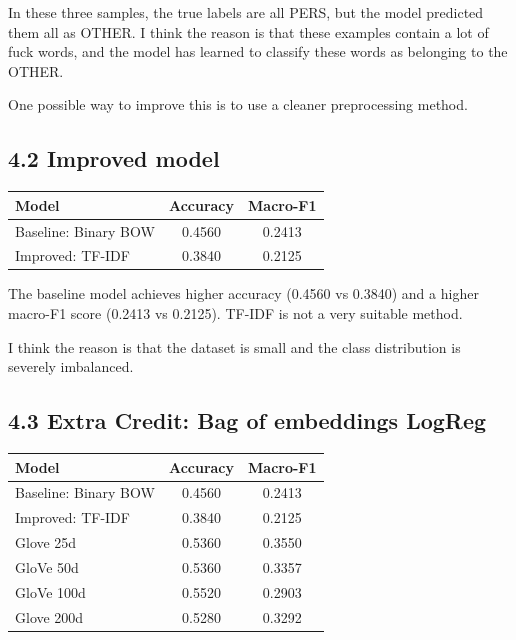 \documentclass[11pt]{article}
\begin{document}
\noindent In these three samples, the true labels are all PERS, but the model predicted them all as OTHER. I think the reason is that these examples contain a lot of fuck words, and the model has learned to classify these words as belonging to the OTHER.

\noindent One possible way to improve this is to use a cleaner preprocessing method.


\subsection*{4.2 Improved model}

\begin{table}[h]
\centering
\begin{tabular}{lcc}
\hline
\textbf{Model} & \textbf{Accuracy} & \textbf{Macro-F1} \\
\hline
Baseline: Binary BOW & 0.4560 & 0.2413 \\
Improved: TF-IDF & 0.3840 & 0.2125 \\
\hline
\end{tabular}
\end{table}

\noindent The baseline model achieves higher accuracy (0.4560 vs 0.3840) and a higher macro-F1 score (0.2413 vs 0.2125). TF-IDF is not a very suitable method.

\noindent I think the reason is that the dataset is small and the class distribution is severely imbalanced.


\newpage
\subsection*{4.3 Extra Credit: Bag of embeddings LogReg}
\begin{table}[h]
\centering
\begin{tabular}{lcc}
\hline
\textbf{Model} & \textbf{Accuracy} & \textbf{Macro-F1} \\
\hline
Baseline: Binary BOW & 0.4560 & 0.2413 \\
Improved: TF-IDF & 0.3840 & 0.2125 \\
Glove 25d &  0.5360   &  0.3550\\
GloVe 50d & 0.5360 & 0.3357 \\
GloVe 100d &0.5520   & 0.2903\\
Glove 200d &0.5280   &  0.3292\\
\hline
\end{tabular}
\end{table}
\end{document}
